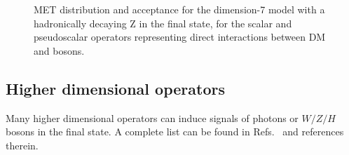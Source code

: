 \begin{figure}[h!]
  \centering
  \hfill
    \caption{MET distribution and acceptance for the dimension-7 model with a hadronically decaying Z in the final state,
    for the scalar and pseudoscalar operators representing direct interactions between DM and bosons.}
    \label{fig:EFTD7_EW_kinematics}
\end{figure}



\subsection{Higher dimensional operators}

Many higher dimensional operators can induce signals of photons or $W/Z/H$ bosons
in the final state. A complete list can be found in Refs.~\cite{Carpenter:2013xra, Berlin:2014cfa, Petrov:2013nia}
and references therein. 

